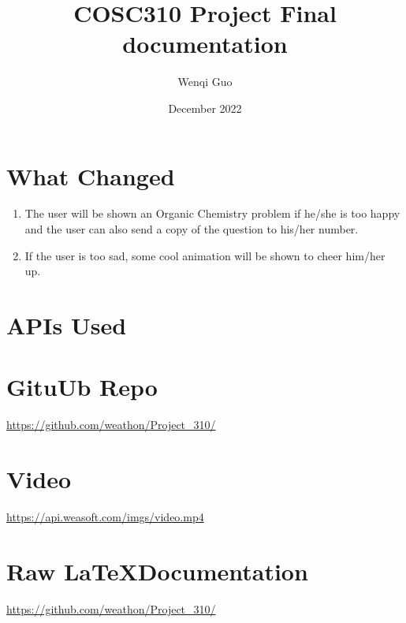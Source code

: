 \documentclass{article}
\title{COSC310 Project Final documentation}
\author{Wenqi Guo}
\date{December 2022}
\begin{document}
\maketitle

\section{What Changed}
\begin{enumerate}
\item The user will be shown an Organic Chemistry problem if he/she is too happy and the user can also send 
a copy of the question to his/her number.
\item If the user is too sad, some cool animation will be shown to cheer him/her up.
\end{enumerate}
\section{APIs Used}
\section{GituUb Repo}
\url{https://github.com/weathon/Project_310/}
\section{Video}
\url{https://api.weasoft.com/imgs/video.mp4}
\section{Raw \LaTeX Documentation}
\url{https://github.com/weathon/Project_310/}
\end{document}
